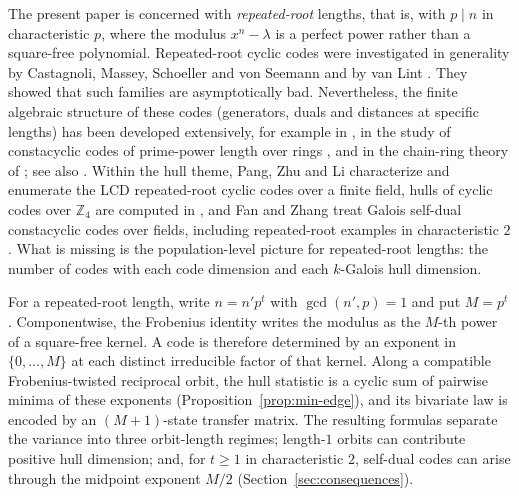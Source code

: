 The present paper is concerned with \emph{repeated-root} lengths, that is,
with $p\mid n$ in characteristic $p$, where the modulus $x^n-\lambda$ is a
perfect power rather than a square-free polynomial. Repeated-root cyclic
codes were investigated in generality by Castagnoli, Massey, Schoeller and
von Seemann \cite{castagnoli1991} and by van Lint \cite{vanLint1991}. They
showed that such families are asymptotically bad. Nevertheless, the finite
algebraic structure of these codes (generators, duals and distances at
specific lengths) has been developed extensively, for example in
\cite{dinh2012}, in the study of constacyclic codes of prime-power length over
rings \cite{dinhai2010}, and in the chain-ring theory of
\cite{dinhLopezPermouth2004}; see also \cite{nortonSalagean2000}. Within the hull theme,
Pang, Zhu and Li \cite{pangZhuLi2018} characterize and enumerate the LCD
repeated-root cyclic codes over a finite field, hulls of cyclic codes over $\mathbb{Z}_4$ are computed in
\cite{jitmanZ4}, and Fan and Zhang
\cite{fanZhang2017} treat Galois self-dual constacyclic codes over fields,
including repeated-root examples in characteristic $2$. What is missing is
the population-level picture for repeated-root lengths: the number of codes
with each code dimension and each $k$-Galois hull dimension.

For a repeated-root length, write $n=n'p^t$ with $\gcd(n',p)=1$ and put
$M=p^t$. Componentwise, the Frobenius identity writes the modulus as the
$M$-th power of a square-free kernel. A code is therefore determined by an
exponent in $\{0,\dots,M\}$ at each distinct irreducible factor of that
kernel. Along a compatible Frobenius-twisted reciprocal orbit, the hull
statistic is a cyclic sum of pairwise minima of these exponents
(Proposition~\ref{prop:min-edge}), and its bivariate law is encoded by an
$(M+1)$-state transfer matrix. The resulting formulas separate the variance
into three orbit-length regimes; length-$1$ orbits can contribute positive
hull dimension; and, for $t\geq1$ in characteristic $2$, self-dual codes can
arise through the midpoint exponent $M/2$
(Section~\ref{sec:consequences}).

